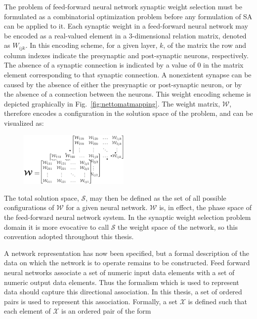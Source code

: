 \documentclass[11pt]{afthesis}
\begin{document}
	 The problem of feed-forward neural network synaptic weight selection must be formulated as a combinatorial optimization problem before any formulation of SA can be applied to it. Each synaptic weight in a feed-forward neural network may be encoded as a real-valued element in a 3-dimensional relation matrix, denoted as $\mathit{W}_{ijk}$. In this encoding scheme, for a given layer, $k$, of the matrix the row and column indexes indicate the presynaptic and post-synaptic neurons, respectively. The absence of a synaptic connection is indicated by a value of $0$ in the matrix element corresponding to that synaptic connection. A nonexistent synapse can be caused by the absence of either the presynaptic or post-synaptic neuron, or by the absence of a connection between the neurons. This weight encoding scheme is depicted graphically in Fig.~\ref{fig:nettomatmapping}. The weight matrix, $\boldsymbol{\mathcal{W}}$, therefore encodes a configuration in the solution space of the problem, and can be visualized as:
	 
	 \begin{figure}[ht!]
	 	\begin{center}
	 		\includegraphics[width = 2.1in]{figures/abstract_matrix_rep.eps}
	 		\label{fig:abstract_matrix_rep}
	 	\end{center}
	 \end{figure}
	 
	 \noindent The total solution space, $\boldsymbol{\mathcal{S}}$, may then be defined as the set of all possible configurations of $\boldsymbol{\mathcal{W}}$ for a given neural network. $\boldsymbol{\mathcal{W}}$ is, in effect, the phase space of the feed-forward neural network system. In the synaptic weight selection problem domain it is more evocative to call $\boldsymbol{\mathcal{S}}$ the weight space of the network, so this convention adopted throughout this thesis. 
	 
	 
	 A network representation has now been specified, but a formal description of the data on which the network is to operate remains to be constructed. Feed forward neural networks associate a set of numeric input data elements with a set of numeric output data elements. Thus the formalism which is used to represent data should capture this directional association. In this thesis, a set of ordered pairs is used to represent this association. Formally, a set $\mathcal{X}$ is defined such that each element of $\mathcal{X}$ is an ordered pair of the form 
	
\end{document}
